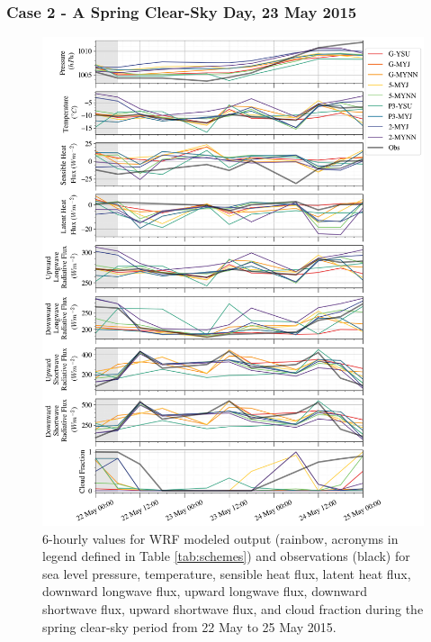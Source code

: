\subsubsection{Case 2 - A Spring Clear-Sky Day, 23 May 2015}
\begin{figure}[p!]
    \centering 
        \vspace*{-2.5cm}
    \hspace*{-0.75cm} 
    \includegraphics[width=1.1\linewidth]{figures/chapter3/wrf_case2.png}
    \caption[Polar WRF Case 2 - Spring clear-sky (23 May 2015) time series]{6-hourly values for WRF modeled output (rainbow, acronyms in legend defined in Table \ref{tab:schemes}) and observations (black) for sea level pressure, temperature, sensible heat flux, latent heat flux, downward longwave flux, upward longwave flux, downward shortwave flux, upward shortwave flux, and cloud fraction during the spring clear-sky period from 22 May to 25 May 2015.}
    \label{fig:wrf_case2}
\end{figure}

